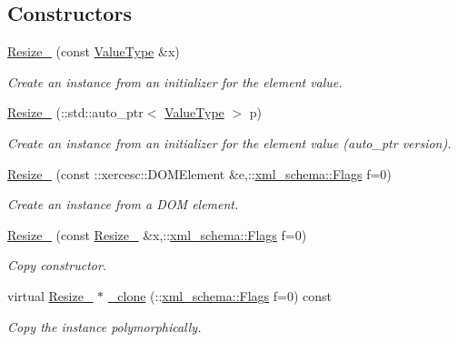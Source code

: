 \subsection*{Constructors}
\begin{DoxyCompactItemize}
\item 
\hyperlink{classopenstack_1_1xml_1_1Resize___a99dd109cf547ed32d4bcb2ae0a916422}{Resize\_\-} (const \hyperlink{classopenstack_1_1xml_1_1Resize}{ValueType} \&x)
\begin{DoxyCompactList}\small\item\em Create an instance from an initializer for the element value. \item\end{DoxyCompactList}\item 
\hyperlink{classopenstack_1_1xml_1_1Resize___a26dd80906e357aafb10e21c62edfc043}{Resize\_\-} (::std::auto\_\-ptr$<$ \hyperlink{classopenstack_1_1xml_1_1Resize}{ValueType} $>$ p)
\begin{DoxyCompactList}\small\item\em Create an instance from an initializer for the element value (auto\_\-ptr version). \item\end{DoxyCompactList}\item 
\hyperlink{classopenstack_1_1xml_1_1Resize___a502fc2a621dcfb620c732a6c06480491}{Resize\_\-} (const ::xercesc::DOMElement \&e,::\hyperlink{namespacexml__schema_affb4c227cbd9aa7453dd1dc5a1401943}{xml\_\-schema::Flags} f=0)
\begin{DoxyCompactList}\small\item\em Create an instance from a DOM element. \item\end{DoxyCompactList}\item 
\hyperlink{classopenstack_1_1xml_1_1Resize___a5a392e2dd955d961baa0c77fc1c18e89}{Resize\_\-} (const \hyperlink{classopenstack_1_1xml_1_1Resize__}{Resize\_\-} \&x,::\hyperlink{namespacexml__schema_affb4c227cbd9aa7453dd1dc5a1401943}{xml\_\-schema::Flags} f=0)
\begin{DoxyCompactList}\small\item\em Copy constructor. \item\end{DoxyCompactList}\item 
virtual \hyperlink{classopenstack_1_1xml_1_1Resize__}{Resize\_\-} $\ast$ \hyperlink{classopenstack_1_1xml_1_1Resize___a08b6dc69ebe2ebd7aa86139c85d6e5a2}{\_\-clone} (::\hyperlink{namespacexml__schema_affb4c227cbd9aa7453dd1dc5a1401943}{xml\_\-schema::Flags} f=0) const 
\begin{DoxyCompactList}\small\item\em Copy the instance polymorphically. \item\end{DoxyCompactList}\end{DoxyCompactItemize}
